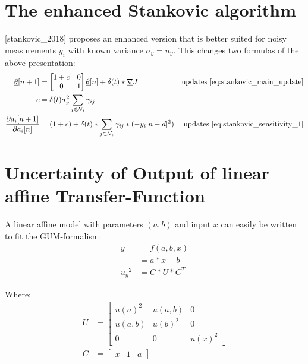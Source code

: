\documentclass[10pt,a4paper,onecolumn]{article}
\renewcommand{\vec}[1]{\underline{#1}}
\begin{document}
    \section{The enhanced Stankovic algorithm}
    [stankovic\_2018] proposes an enhanced version that is better suited for noisy measurements $y_i$ with known variance $\sigma_y = u_y$. This changes two formulas of the above presentation:
    \begin{align}
        \vec{\theta}[n+1] &= \begin{bmatrix} 1 + c & 0 \\ 0 & 1 \end{bmatrix} \vec{\theta}[n] + \delta(t) * \vec{\nabla} J  & \text{updates \cref{eq:stankovic_main_update}} \\ 
        c &= \delta(t) \sigma_y^2 \sum_{j \in \mathcal{N}_i} \gamma_{ij} \\
        \frac{\partial a_i[n+1]}{\partial a_i[n]} &= (1 + c) + \delta(t) * \sum_{j \in \mathcal{N}_i} \gamma_{ij} * (- {y_i}[n-d]^2) & \text{updates \cref{eq:stankovic_sensitivity_1}} 
    \end{align}

    
    \section{Uncertainty of Output of linear affine Transfer-Function}
    A linear affine model with parameters $(a,b)$ and input $x$ can easily be written to fit the GUM-formalism:
    \begin{align}
        y &= f(a,b,x) \label{eq:linear_affine_model}\\
        &= a*x + b \\
        {u_y}^2 &= C * U * C^T
    \end{align}
    
    Where:
    \begin{align}
        U &=  
        \begin{bmatrix}
            u(a)^2 & u(a, b) & 0 \\
            u(a, b) & u(b)^2 & 0 \\
            0 & 0 & u(x)^2 
        \end{bmatrix} \\
        C &= \begin{bmatrix} x & 1 & a \end{bmatrix}
    \end{align}
    
\end{document}

